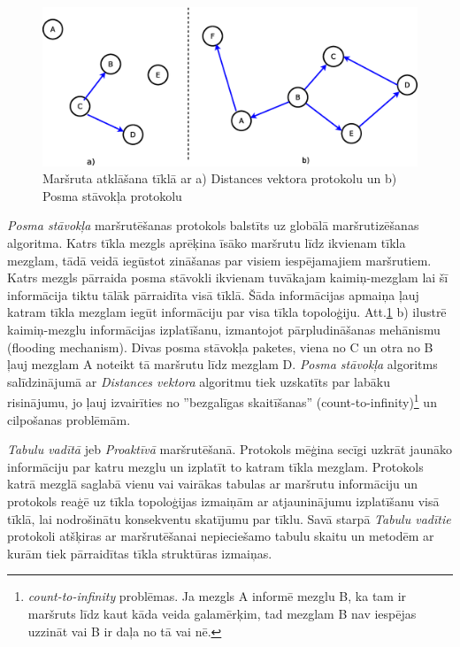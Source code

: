 \begin{figure}[ht!]
\centering
\includegraphics[scale=0.38]{./graph/dis_link}
 \caption{Maršruta atklāšana tīklā ar a) Distances vektora protokolu  un b) Posma stāvokļa protokolu}
\label{fig:rout}
\end{figure}

\textit{Posma stāvokļa} maršrutēšanas protokols balstīts uz globālā maršrutizēšanas algoritma. Katrs tīkla mezgls aprēķina īsāko maršrutu līdz ikvienam tīkla mezglam, tādā veidā iegūstot zināšanas par visiem iespējamajiem maršrutiem. Katrs mezgls pārraida posma stāvokli ikvienam tuvākajam kaimiņ-mezglam lai šī informācija tiktu tālāk pārraidīta visā tīklā. Šāda informācijas apmaiņa ļauj katram tīkla mezglam iegūt informāciju par visa tīkla topoloģiju. Att.\ref{fig:rout} b) ilustrē kaimiņ-mezglu informācijas izplatīšanu, izmantojot pārpludināšanas mehānismu (flooding mechanism). Divas posma stāvokļa paketes, viena no C un otra no B ļauj mezglam A noteikt tā maršrutu līdz mezglam D. \textit{Posma stāvokļa} algoritms salīdzinājumā ar \textit{Distances vektora} algoritmu tiek uzskatīts par labāku risinājumu, jo ļauj izvairīties no ''bezgalīgas skaitīšanas'' (count-to-infinity)\footnote{\emph{count-to-infinity} problēmas. Ja mezgls A informē mezglu B, ka tam ir maršruts līdz kaut kāda veida galamērķim, tad mezglam B nav iespējas uzzināt vai B ir daļa no tā vai nē.} un cilpošanas problēmām.

\textit{Tabulu vadītā} jeb \textit{Proaktīvā} maršrutēšanā. Protokols mēģina secīgi uzkrāt jaunāko informāciju par katru mezglu un izplatīt to katram tīkla mezglam. Protokols katrā mezglā saglabā vienu vai vairākas tabulas ar maršrutu informāciju un protokols reaģē uz tīkla topoloģijas izmaiņām ar atjauninājumu izplatīšanu visā tīklā, lai nodrošinātu konsekventu skatījumu par tīklu. Savā starpā \textit{Tabulu vadītie} protokoli atšķiras ar maršrutēšanai nepieciešamo tabulu skaitu un metodēm ar kurām tiek pārraidītas tīkla struktūras izmaiņas.

